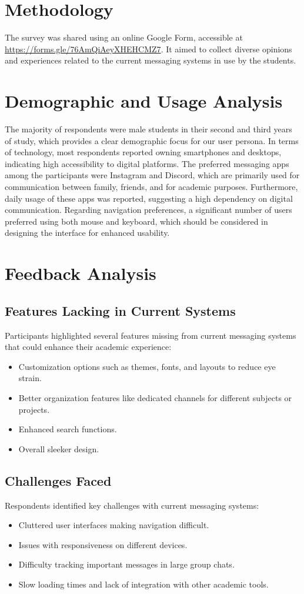 \documentclass[12pt,a4paper]{article}
\begin{document}
\section{Methodology}
The survey was shared using an online Google Form, accessible at \url{https://forms.gle/76AmQiAeyXHEHCMZ7}. It aimed to collect diverse opinions and experiences related to the current messaging systems in use by the students.

\section{Demographic and Usage Analysis}
The majority of respondents were male students in their second and third years of study, which provides a clear demographic focus for our user persona. In terms of technology, most respondents reported owning smartphones and desktops, indicating high accessibility to digital platforms. The preferred messaging apps among the participants were Instagram and Discord, which are primarily used for communication between family, friends, and for academic purposes. Furthermore, daily usage of these apps was reported, suggesting a high dependency on digital communication. Regarding navigation preferences, a significant number of users preferred using both mouse and keyboard, which should be considered in designing the interface for enhanced usability.

\section{Feedback Analysis}
\subsection{Features Lacking in Current Systems}
Participants highlighted several features missing from current messaging systems that could enhance their academic experience:
\begin{itemize}
    \item Customization options such as themes, fonts, and layouts to reduce eye strain.
    \item Better organization features like dedicated channels for different subjects or projects.
    \item Enhanced search functions.
    \item Overall sleeker design.
\end{itemize}

\subsection{Challenges Faced}
Respondents identified key challenges with current messaging systems:
\begin{itemize}
    \item Cluttered user interfaces making navigation difficult.
    \item Issues with responsiveness on different devices.
    \item Difficulty tracking important messages in large group chats.
    \item Slow loading times and lack of integration with other academic tools.
\end{itemize}
\end{document}
